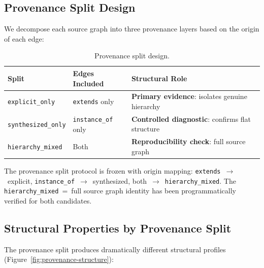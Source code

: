 \documentclass[runningheads]{llncs}
\begin{document}
\subsection{Provenance Split Design}

We decompose each source graph into three provenance layers based on the origin of each edge:

\begin{table}[h]
\centering
\caption{Provenance split design.}
\label{tab:provenance-split}
\begin{tabular}{lll}
\toprule
Split & Edges Included & Structural Role \\
\midrule
\texttt{explicit\_only} & \texttt{extends} only & \textbf{Primary evidence}: isolates genuine hierarchy \\
\texttt{synthesized\_only} & \texttt{instance\_of} only & \textbf{Controlled diagnostic}: confirms flat structure \\
\texttt{hierarchy\_mixed} & Both & \textbf{Reproducibility check}: full source graph \\
\bottomrule
\end{tabular}
\end{table}

The provenance split protocol is frozen with origin mapping: \texttt{extends}~$\to$~explicit, \texttt{instance\_of}~$\to$~synthesized, both~$\to$~\texttt{hierarchy\_mixed}. The \texttt{hierarchy\_mixed}~=~full source graph identity has been programmatically verified for both candidates.

\subsection{Structural Properties by Provenance Split}

The provenance split produces dramatically different structural profiles (Figure~\ref{fig:provenance-structure}):
\end{document}
